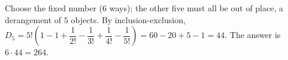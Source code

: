 Choose the fixed number ($6$ ways); the other five must all be out of place, a derangement of $5$ objects. By inclusion-exclusion, $D_5=5!\left(1-1+\dfrac{1}{2!}-\dfrac{1}{3!}+\dfrac{1}{4!}-\dfrac{1}{5!}\right)=60-20+5-1=44$. The answer is $6\cdot44=\boxed{264}$.
